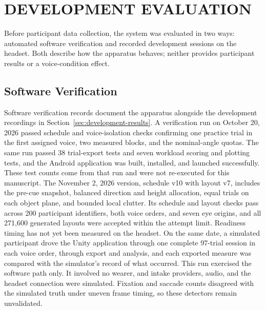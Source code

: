 \chapter{DEVELOPMENT EVALUATION}
\label{app:development}
\label{sec:development-evaluation}
Before participant data collection, the system was evaluated in two ways: automated software verification and recorded development sessions on the headset. Both describe how the apparatus behaves; neither provides participant results or a voice-condition effect.

\section{Software Verification}
Software verification records document the apparatus alongside the development recordings in Section~\ref{sec:development-results}. A verification run on October 20, 2026 passed schedule and voice-isolation checks confirming one practice trial in the first assigned voice, two measured blocks, and the nominal-angle quotas. The same run passed 38 trial-export tests and seven workload scoring and plotting tests, and the Android application was built, installed, and launched successfully. These test counts come from that run and were not re-executed for this manuscript. The November 2, 2026 version, schedule v10 with layout v7, includes the pre-cue snapshot, balanced direction and height allocation, equal trials on each object plane, and bounded local clutter. Its schedule and layout checks pass across 200 participant identifiers, both voice orders, and seven eye origins, and all 271,600 generated layouts were accepted within the attempt limit. Readiness timing has not yet been measured on the headset. On the same date, a simulated participant drove the Unity application through one complete 97-trial session in each voice order, through export and analysis, and each exported measure was compared with the simulator's record of what occurred. This run exercised the software path only. It involved no wearer, and intake providers, audio, and the headset connection were simulated. Fixation and saccade counts disagreed with the simulated truth under uneven frame timing, so these detectors remain unvalidated.
